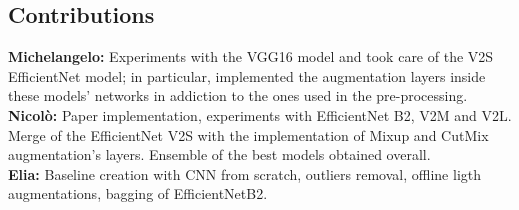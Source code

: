 \documentclass[11pt]{article}
\begin{document}
\begin{multicols}{2}
    \subsection*{Contributions}

    \textbf{Michelangelo:} Experiments with the VGG16 model and took care of the V2S EfficientNet model; in particular, implemented the augmentation layers inside these models' networks in addiction to the ones used in the pre-processing.\\
    \textbf{Nicolò:} Paper implementation, experiments with EfficientNet B2, V2M and V2L. Merge of the EfficientNet V2S with the implementation of Mixup and CutMix augmentation's layers. Ensemble of the best models obtained overall. \\
    \textbf{Elia:} Baseline creation with CNN from scratch, outliers removal, offline ligth augmentations, bagging of EfficientNetB2.\\
    
\end{multicols}
\newpage



\end{document}
